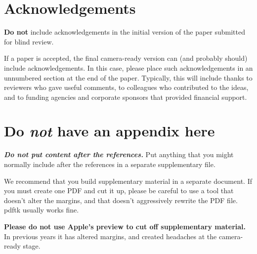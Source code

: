 \documentclass{article}
\begin{document}
\section*{Acknowledgements}

\textbf{Do not} include acknowledgements in the initial version of
the paper submitted for blind review.

If a paper is accepted, the final camera-ready version can (and
probably should) include acknowledgements. In this case, please
place such acknowledgements in an unnumbered section at the
end of the paper. Typically, this will include thanks to reviewers
who gave useful comments, to colleagues who contributed to the ideas,
and to funding agencies and corporate sponsors that provided financial
support.

\nocite{langley00}





\appendix
\section{Do \emph{not} have an appendix here}

\textbf{\emph{Do not put content after the references.}}
%
Put anything that you might normally include after the references in a separate
supplementary file.

We recommend that you build supplementary material in a separate document.
If you must create one PDF and cut it up, please be careful to use a tool that
doesn't alter the margins, and that doesn't aggressively rewrite the PDF file.
pdftk usually works fine. 

\textbf{Please do not use Apple's preview to cut off supplementary material.} In
previous years it has altered margins, and created headaches at the camera-ready
stage. 
\end{document}

